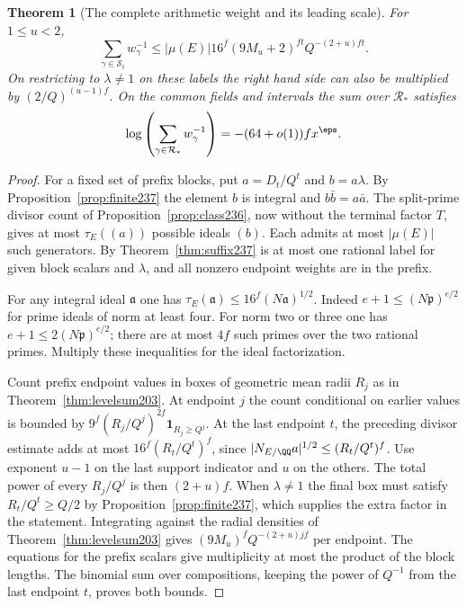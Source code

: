 \documentclass[a4paper,11pt]{article}
\newtheorem{theorem}[proposition]{Theorem}
\theoremstyle{definition}
\theoremstyle{remark}
\numberwithin{equation}{section}
\begin{document}
\begin{theorem}[The complete arithmetic weight and its leading scale]
\leavevmode\label{thm:sum237}
For \(1\le u<2\),
\[
 \sum_{\gamma\in\mathcal S_t}w_\gamma^{-1}
       \le |\mu(E)|16^f(9M_u+2)^{ft}Q^{-(2+u)ft}.
\]
On restricting to \(\lambda\ne1\) on these labels the right hand
side can also be multiplied by \((2/Q)^{(u-1)f}\). On the common
fields and intervals the sum over \(\mathcal R_*\) satisfies
\[
       \log\left(\sum_{\gamma\in\mathcal R_*} w_\gamma^{-1}\right)
                      =-(64+o(1))f x^\eps .
\]
\end{theorem}
\begin{proof}
For a fixed set of prefix blocks, put \(a=D_t/Q^t\) and
\(b=a\lambda\). By Proposition~\ref{prop:finite237} the element
\(b\) is integral and \(b\bar b=a\bar a\). The split-prime
divisor count of Proposition~\ref{prop:class236}, now without
the terminal factor \(T\), gives at most \(\tau_E((a))\)
possible ideals \((b)\). Each admits at most \(|\mu(E)|\)
such generators. By Theorem~\ref{thm:suffix237} is
at most one rational label for given block scalars and
\(\lambda\), and all nonzero endpoint weights are in the prefix.

For any integral ideal \(\mathfrak a\) one has
\(\tau_E(\mathfrak a)\le16^f(N\mathfrak a)^{1/2}\).
Indeed \(e+1\le(N\mathfrak p)^{e/2}\) for prime ideals of norm
at least four. For norm two or three one has
\(e+1\le2(N\mathfrak p)^{e/2}\); there are at most \(4f\)
such primes over the two rational primes. Multiply these
inequalities for the ideal factorization.

Count prefix endpoint values in boxes of geometric mean radii
\(R_j\) as in Theorem~\ref{thm:levelsum203}. At endpoint \(j\)
the count conditional on earlier values is bounded by
\(9^f(R_j/Q^j)^{2f}\mathbf1_{R_j\ge Q^j}\).
At the last endpoint \(t\), the preceding divisor estimate
adds at most \(16^f(R_t/Q^t)^f\), since
\(|N_{E/\QQ}a|^{1/2}\le(R_t/Q^t)^f\).
Use exponent \(u-1\) on the last support indicator and \(u\)
on the others. The total power of every \(R_j/Q^j\) is then
\((2+u)f\). When \(\lambda\ne1\) the final box must satisfy
\(R_t/Q^t\ge Q/2\) by Proposition~\ref{prop:finite237},
which supplies the extra factor in the statement.
Integrating against the radial densities of
Theorem~\ref{thm:levelsum203} gives \((9M_u)^f Q^{-(2+u)jf}\)
per endpoint. The equations for the prefix scalars give
multiplicity at most the product of the block lengths.
The binomial sum over compositions, keeping the power of
\(Q^{-1}\) from the last endpoint \(t\), proves both bounds.


\end{proof}
\end{document}
